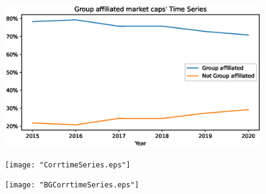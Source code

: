 \documentclass[12pt, a4paper]{article}
\begin{document}
\begin{figure}
	\centering  
	\includegraphics[width=\linewidth]{"BGMarketCaptimeSeries.eps"}
	
\end{figure}
 
\begin{figure}
	\centering  
	\texttt{[image: "CorrtimeSeries.eps"]}
\end{figure}    

\begin{figure}
	\centering  
	\texttt{[image: "BGCorrtimeSeries.eps"]}
\end{figure}
\end{document}
